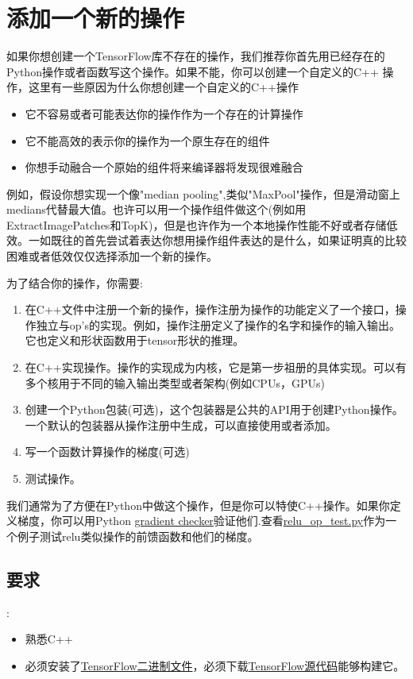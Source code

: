 \documentclass{book}
\begin{document}
\section{添加一个新的操作}
如果你想创建一个TensorFlow库不存在的操作，我们推荐你首先用已经存在的Python操作或者函数写这个操作。如果不能，你可以创建一个自定义的C++
操作，这里有一些原因为什么你想创建一个自定义的C++操作
\begin{itemize}
		\item 它不容易或者可能表达你的操作作为一个存在的计算操作
		\item 它不能高效的表示你的操作为一个原生存在的组件
		\item 你想手动融合一个原始的组件将来编译器将发现很难融合
\end{itemize}
例如，假设你想实现一个像"median pooling",类似"MaxPool"操作，但是滑动窗上medians代替最大值。也许可以用一个操作组件做这个(例如用ExtractImagePatches和TopK)，但是也许作为一个本地操作性能不好或者存储低效。一如既往的首先尝试着表达你想用操作组件表达的是什么，如果证明真的比较困难或者低效仅仅选择添加一个新的操作。

为了结合你的操作，你需要:
\begin{enumerate}
		\item 在C++文件中注册一个新的操作，操作注册为操作的功能定义了一个接口，操作独立与op's的实现。例如，操作注册定义了操作的名字和操作的输入输出。它也定义和形状函数用于tensor形状的推理。
		\item 在C++实现操作。操作的实现成为内核，它是第一步祖册的具体实现。可以有多个核用于不同的输入输出类型或者架构(例如CPUs，GPUs)
		\item 创建一个Python包装(可选)，这个包装器是公共的API用于创建Python操作。一个默认的包装器从操作注册中生成，可以直接使用或者添加。
		\item 写一个函数计算操作的梯度(可选)
		\item 测试操作。
\end{enumerate}
我们通常为了方便在Python中做这个操作，但是你可以特使C++操作。如果你定义梯度，你可以用Python \href{https://www.tensorflow.org/api_docs/python/tf/test/compute_gradient_error}{gradient checker}验证他们.查看\href{https://www.github.com/tensorflow/tensorflow/blob/r1.4/tensorflow/python/kernel_tests/relu_op_test.py}{relu\_op\_test.py}作为一个例子测试relu类似操作的前馈函数和他们的梯度。
\subsection{要求}:
\begin{itemize}
		\item 熟悉C++
		\item 必须安装了\href{https://www.tensorflow.org/install/index}{TensorFlow二进制文件}，必须下载\href{https://www.tensorflow.org/install/install_sources}{TensorFlow源代码}能够构建它。
\end{itemize}
\end{document}
